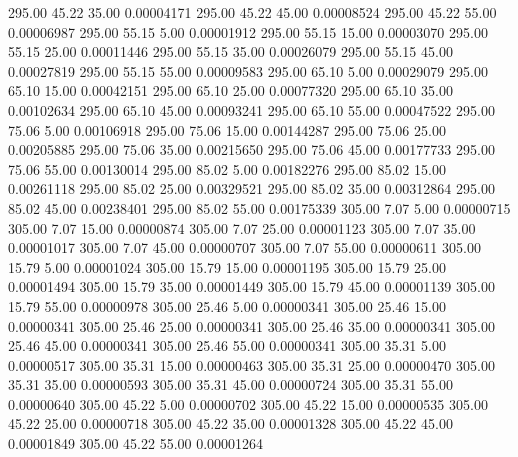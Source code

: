     295.00     45.22     35.00     0.00004171
    295.00     45.22     45.00     0.00008524
    295.00     45.22     55.00     0.00006987
    295.00     55.15      5.00     0.00001912
    295.00     55.15     15.00     0.00003070
    295.00     55.15     25.00     0.00011446
    295.00     55.15     35.00     0.00026079
    295.00     55.15     45.00     0.00027819
    295.00     55.15     55.00     0.00009583
    295.00     65.10      5.00     0.00029079
    295.00     65.10     15.00     0.00042151
    295.00     65.10     25.00     0.00077320
    295.00     65.10     35.00     0.00102634
    295.00     65.10     45.00     0.00093241
    295.00     65.10     55.00     0.00047522
    295.00     75.06      5.00     0.00106918
    295.00     75.06     15.00     0.00144287
    295.00     75.06     25.00     0.00205885
    295.00     75.06     35.00     0.00215650
    295.00     75.06     45.00     0.00177733
    295.00     75.06     55.00     0.00130014
    295.00     85.02      5.00     0.00182276
    295.00     85.02     15.00     0.00261118
    295.00     85.02     25.00     0.00329521
    295.00     85.02     35.00     0.00312864
    295.00     85.02     45.00     0.00238401
    295.00     85.02     55.00     0.00175339
    305.00      7.07      5.00     0.00000715
    305.00      7.07     15.00     0.00000874
    305.00      7.07     25.00     0.00001123
    305.00      7.07     35.00     0.00001017
    305.00      7.07     45.00     0.00000707
    305.00      7.07     55.00     0.00000611
    305.00     15.79      5.00     0.00001024
    305.00     15.79     15.00     0.00001195
    305.00     15.79     25.00     0.00001494
    305.00     15.79     35.00     0.00001449
    305.00     15.79     45.00     0.00001139
    305.00     15.79     55.00     0.00000978
    305.00     25.46      5.00     0.00000341
    305.00     25.46     15.00     0.00000341
    305.00     25.46     25.00     0.00000341
    305.00     25.46     35.00     0.00000341
    305.00     25.46     45.00     0.00000341
    305.00     25.46     55.00     0.00000341
    305.00     35.31      5.00     0.00000517
    305.00     35.31     15.00     0.00000463
    305.00     35.31     25.00     0.00000470
    305.00     35.31     35.00     0.00000593
    305.00     35.31     45.00     0.00000724
    305.00     35.31     55.00     0.00000640
    305.00     45.22      5.00     0.00000702
    305.00     45.22     15.00     0.00000535
    305.00     45.22     25.00     0.00000718
    305.00     45.22     35.00     0.00001328
    305.00     45.22     45.00     0.00001849
    305.00     45.22     55.00     0.00001264
